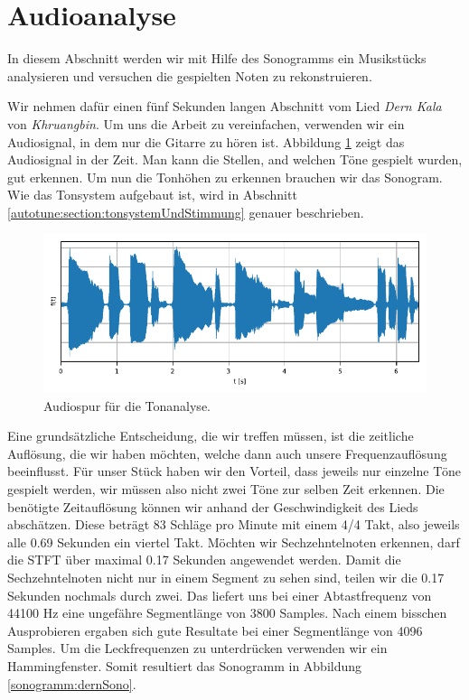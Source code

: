 %
%
%
%
\section{Audioanalyse
\label{sonogramm:section:teil2}}
In diesem Abschnitt werden wir mit Hilfe des Sonogramms ein Musikstücks
analysieren und versuchen die gespielten Noten zu rekonstruieren.

Wir nehmen dafür einen fünf Sekunden langen Abschnitt vom Lied
{\em Dern Kala} von {\em Khruangbin}.
Um uns die Arbeit zu vereinfachen, verwenden wir ein Audiosignal, in
dem nur die Gitarre zu hören ist.
Abbildung \ref{sonogramm:dernTime} zeigt das Audiosignal in der Zeit.
Man kann die Stellen, and welchen Töne gespielt wurden, gut erkennen.
Um nun die Tonhöhen zu erkennen brauchen wir das Sonogram.
Wie das Tonsystem aufgebaut ist, wird in Abschnitt \ref{autotune:section:tonsystemUndStimmung}
genauer beschrieben.
\begin{figure}
    \centering
    \includegraphics{papers/sonogramm/images/audioTimeDern.pdf}
    \caption{Audiospur für die Tonanalyse.
    \label{sonogramm:dernTime}
    }
\end{figure}

Eine grundsätzliche Entscheidung, die wir treffen müssen,
ist die zeitliche Auflösung, die wir haben möchten, welche 
dann auch unsere Frequenzauflösung beeinflusst.
Für unser Stück haben wir den Vorteil, dass jeweils nur einzelne
Töne gespielt werden, wir müssen also nicht zwei Töne zur selben 
Zeit erkennen.
Die benötigte Zeitauflösung können wir anhand der Geschwindigkeit des Lieds abschätzen.
Diese beträgt 83 Schläge pro Minute mit einem 4/4 Takt, also jeweils alle 0.69 Sekunden ein viertel Takt.
Möchten wir Sechzehntelnoten erkennen, darf die STFT über maximal 0.17 Sekunden
angewendet werden.
Damit die Sechzehntelnoten nicht nur in einem Segment zu sehen sind, teilen
wir die 0.17 Sekunden nochmals durch zwei.
Das liefert uns bei einer Abtastfrequenz von 44100 Hz eine ungefähre Segmentlänge von 
3800 Samples. 
Nach einem bisschen Ausprobieren ergaben sich gute Resultate bei einer Segmentlänge
von 4096 Samples.
Um die Leckfrequenzen zu unterdrücken verwenden wir ein Hammingfenster.
Somit resultiert das Sonogramm in Abbildung \ref{sonogramm:dernSono}.

